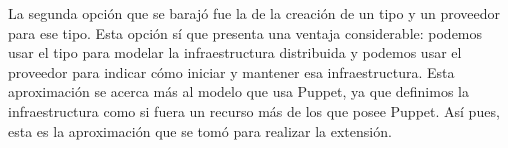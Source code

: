 La segunda opción que se barajó fue la de la creación de un tipo y un proveedor para ese tipo. Esta opción sí que presenta una ventaja considerable: podemos usar el tipo para modelar la infraestructura distribuida y podemos usar el proveedor para indicar cómo iniciar y mantener esa infraestructura. Esta aproximación se acerca más al modelo que usa Puppet, ya que definimos la infraestructura como si fuera un recurso más de los que posee Puppet. Así pues, esta es la aproximación que se tomó para realizar la extensión.
